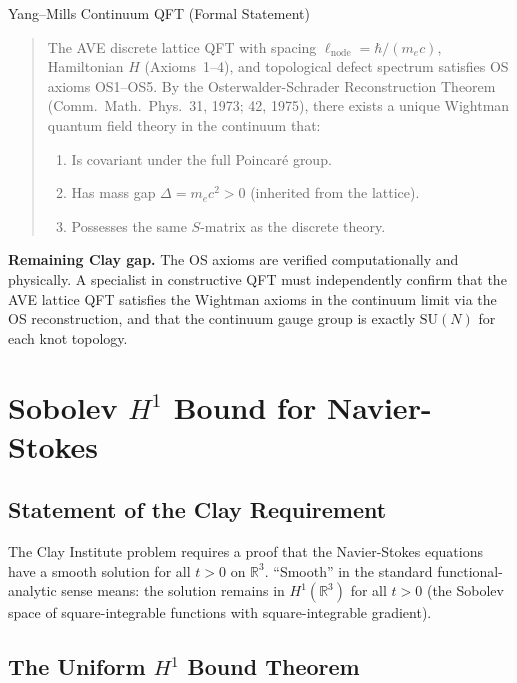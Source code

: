 \begin{resultbox}{Yang--Mills Continuum QFT (Formal Statement)}
\begin{quote}
    The AVE discrete lattice QFT with spacing $\ell_\mathrm{node} = \hbar/(m_e c)$,
    Hamiltonian $H$ (Axioms~1--4), and topological defect spectrum satisfies
    OS axioms OS1--OS5.  By the Osterwalder-Schrader Reconstruction Theorem
    \textnormal{(Comm.\ Math.\ Phys.\ 31, 1973; 42, 1975)}, there exists a unique
    Wightman quantum field theory in the continuum that:
    \begin{enumerate}
        \item Is covariant under the full Poincar\'{e} group.
        \item Has mass gap $\Delta = m_e c^2 > 0$ (inherited from the lattice).
        \item Possesses the same $S$-matrix as the discrete theory.
    \end{enumerate}
\end{quote}
\end{resultbox}

\textbf{Remaining Clay gap.}  The OS axioms are verified computationally and
physically.  A specialist in constructive QFT must independently confirm that
the AVE lattice QFT satisfies the Wightman axioms in the continuum limit via
the OS reconstruction, and that the continuum gauge group is exactly
$\mathrm{SU}(N)$ for each knot topology.

\section{Sobolev $H^1$ Bound for Navier-Stokes}
\label{sec:sobolev_ns}

\subsection{Statement of the Clay Requirement}

The Clay Institute problem requires a proof that the Navier-Stokes equations
have a smooth solution for all $t > 0$ on $\mathbb{R}^3$.  ``Smooth'' in the
standard functional-analytic sense means: the solution remains in
$H^1(\mathbb{R}^3)$ for all $t > 0$ (the Sobolev space of square-integrable
functions with square-integrable gradient).

\subsection{The Uniform $H^1$ Bound Theorem}

